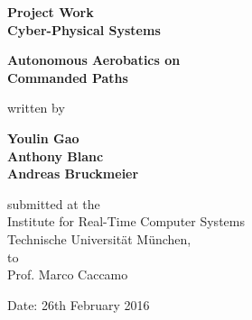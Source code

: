 \documentclass[11pt,a4paper]{scrartcl}		%
\begin{document}

\begin{titlepage}
	
	\singlespacing
	\begin{center}
	
		\quad
		\vspace{1cm}
	
		\Large{\textbf{Project Work\\Cyber-Physical Systems}}
	
		\vspace{1.5cm}
	
		\huge{\textbf{Autonomous Aerobatics on\\Commanded Paths}}
	
		\vspace{1.5cm}
	
		written by
		
		\vspace{1.5cm}
	
		\Large{\textbf{Youlin Gao\\Anthony Blanc\\Andreas Bruckmeier}}
	
		\vfill
		
		submitted at the\\
		Institute for Real-Time Computer Systems\\
		Technische Universität München,\\
		to\\
		Prof. Marco Caccamo

		\vspace{1cm}		
		
		Date: 26th February 2016
	
	\end{center}
	
\end{titlepage}



\newpage
\tableofcontents	

\vfill


\listoffigures
\end{document}
